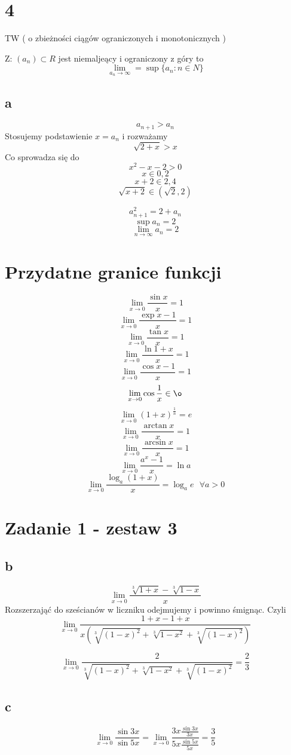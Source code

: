 \documentclass{article}
\begin{document}
\section{4}
TW ( o zbieżności ciągów ograniczonych i monotonicznych )
\bigskip

Z: $ (a_n) \subset R $ jest niemaljeący i ograniczony z góry to
$$ \lim_{a_n \to \infty} = \sup \{a_n : n \in N \} $$

\subsection{a}
$$ a_{n+1} > a_n $$
Stosujemy podstawienie $ x = a_n  $ i rozważamy
$$ \sqrt{2 + x} > x $$
Co sprowadza się do
$$ x^2 - x - 2 > 0 $$
$$ x \in {0,2} $$
$$ x+2 \in { 2, 4 } $$
$$ \sqrt{x+2} \in ( \sqrt{2}, 2  ) $$

$$ a_{n+1}^2 = 2 + a_n $$
$$ \sup { a_n } = 2 $$
$$ \lim_{ n \to \infty }{a_n} = 2 $$

\newpage
\section{Przydatne granice funkcji}
$$ \lim_{x \to 0}{\frac{\sin{x}}{x}} = 1 $$
$$ \lim_{x \to 0}{\frac{\exp{x} - 1}{x}} = 1 $$
$$ \lim_{x \to 0}{\frac{\tan{x}}{x}} = 1 $$
$$ \lim_{x \to 0}{\frac{ \ln{ 1+x }}{ x }} = 1 $$
$$ \lim_{x \to 0}{\frac{ \cos{x} - 1}{x}} = 1 $$
$$ \lim_{x \to 0}{\cos {\frac{1}{x}}} \in \o $$
$$ \lim_{x \to 0}{ \left( 1 + x \right) ^\frac{1}{n}} = e $$
$$\lim_{x \to 0}{\frac{\arctan{x}}{x}} = 1 $$
$$\lim_{x \to 0}{\frac{\arcsin{x}}{x}} = 1 $$
$$\lim_{x \to 0}{\frac{a^x-1}{x}} = \ln{a} $$
$$\lim_{x \to 0}{\frac{\log_{a}(1+x)}{x}} = \log_{a}{e} \ \ \  \forall{a>0} $$

\section{Zadanie 1 - zestaw 3}
\subsection{b}
$$\lim_{x \to 0}{\frac{\sqrt[3]{1+x} - \sqrt[3]{1-x}}{x}} $$
Rozszerzająć do sześcianów w liczniku odejmujemy i powinno śmignąc. Czyli
$$\lim_{x \to 0}{\frac{1+x - 1 + x}{x (\sqrt[3]{(1-x)^2} +
\sqrt[3]{1-x^2} + \sqrt[3]{(1-x)^2})}}$$

$$\lim_{x \to 0}{\frac{2}{\sqrt[3]{(1-x)^2} +
\sqrt[3]{1-x^2} + \sqrt[3]{(1-x)^2}}} = \frac{2}{3}$$

\subsection{c}
$$\lim_{x \to 0}{\frac{\sin{3x}}{\sin{5x}}} = \lim_{x \to 0}{\frac{3x \frac{\sin{3x}}{3x}}{5x \frac{\sin{5x}}{5x}}} = \frac{3}{5} $$
\end{document}
